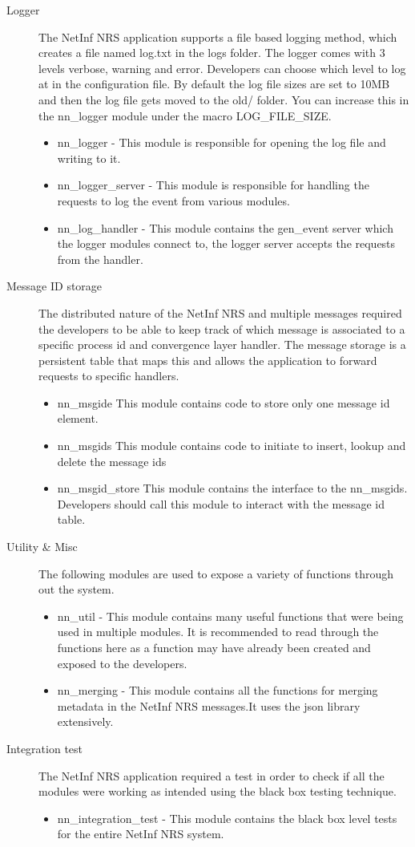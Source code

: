 \begin{description}
\item[Logger]
The NetInf NRS application supports a file based logging method, which creates a file named log.txt in the logs folder. The logger comes with 3 levels verbose, warning and error. Developers can choose which level to log at in the configuration file. By default the log file sizes are set to 10MB and then the log file gets moved to the old/ folder. You can increase this in the nn\_logger module under the macro LOG\_FILE\_SIZE.
\begin{itemize}
\item nn\_logger - This module is responsible for opening the log file and writing to it.
\item nn\_logger\_server - This module is responsible for handling the requests to log the event from various modules.
\item nn\_log\_handler - This module contains the gen\_event server which the logger modules connect to, the logger server accepts the requests from the handler.
\end{itemize}
\item [Message ID storage]
The distributed nature of the NetInf NRS and multiple messages required the developers to be able to keep track of which message is associated to a specific process id and convergence layer handler. The message storage is a persistent table that maps this and allows the application to forward requests to specific handlers. 
\begin{itemize}
\item nn\_msgide This module contains code to store only one message id element. 
\item nn\_msgids This module contains code to initiate to insert, lookup and delete the message ids
\item nn\_msgid\_store This module contains the interface to the nn\_msgids. Developers should call this module to interact with the message id table.
\end{itemize}
\item [Utility \& Misc]
The following modules are used to expose a variety of functions through out the system.
\begin{itemize}
\item nn\_util - This module contains many useful functions that were being used in multiple modules. It is recommended to read through the functions here as a function may have already been created and exposed to the developers.
\item nn\_merging - This module contains all the functions for merging metadata in the NetInf NRS messages.It uses the json library extensively.
\end {itemize}
\item [Integration test]
The NetInf NRS application required a test in order to check if all the modules were working as intended using the black box testing technique. 
\begin{itemize}
\item nn\_integration\_test - This module contains the black box level tests for the entire NetInf NRS system.
\end{itemize}

\end{description}

